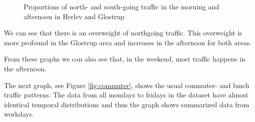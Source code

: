 \begin{figure}[htbp]

\caption{Proportions of north- and south-going traffic in the morning and afternoon in Herlev and Glostrup}
\label{fig:proportions}
\end{figure}

We can see that there is an overweight of northgoing traffic. This overweight is more profound in the Glostrup area and increases in the afternoon for both areas.

From these graphs we can also see that, in the weekend, most traffic happens in the afternoon.

The next graph, see Figure \ref{fig:commuter}, shows the usual commuter- and lunch traffic patterns. The data from all mondays to fridays in the dataset have almost identical temporal distributions and thus the graph shows summarized data from workdays.

